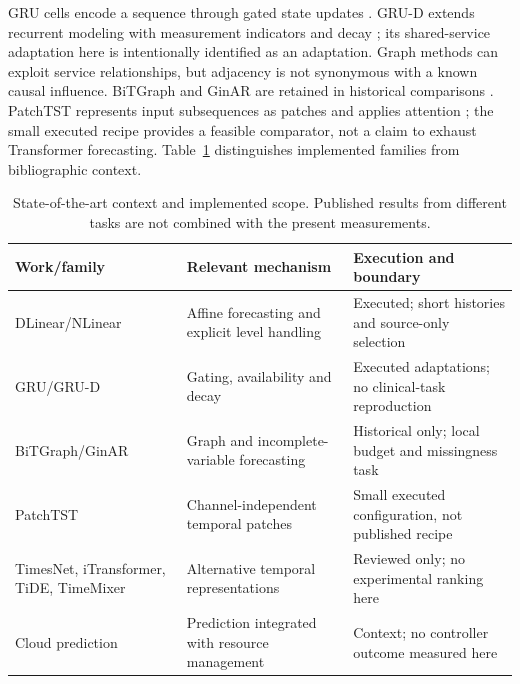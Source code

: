 GRU cells encode a sequence through gated state updates \cite{gru}. GRU-D extends recurrent modeling with measurement indicators and decay \cite{grud}; its shared-service adaptation here is intentionally identified as an adaptation. Graph methods can exploit service relationships, but adjacency is not synonymous with a known causal influence. BiTGraph and GinAR are retained in historical comparisons \cite{bitgraph,ginar}. PatchTST represents input subsequences as patches and applies attention \cite{patchtst}; the small executed recipe provides a feasible comparator, not a claim to exhaust Transformer forecasting. Table~\ref{tab:related} distinguishes implemented families from bibliographic context.

\begin{table}[!t]
\caption{State-of-the-art context and implemented scope. Published results from different tasks are not combined with the present measurements.}\label{tab:related}
\centering\footnotesize
\begin{tabularx}{\linewidth}{p{.23\linewidth}XX}
\toprule Work/family & Relevant mechanism & Execution and boundary \\\midrule
DLinear/NLinear \cite{dlinear} & Affine forecasting and explicit level handling & Executed; short histories and source-only selection \\
GRU/GRU-D \cite{gru,grud} & Gating, availability and decay & Executed adaptations; no clinical-task reproduction \\
BiTGraph/GinAR \cite{bitgraph,ginar} & Graph and incomplete-variable forecasting & Historical only; local budget and missingness task \\
PatchTST \cite{patchtst} & Channel-independent temporal patches & Small executed configuration, not published recipe \\
TimesNet, iTransformer, TiDE, TimeMixer \cite{timesnet,itransformer,tide,timemixer} & Alternative temporal representations & Reviewed only; no experimental ranking here \\
Cloud prediction \cite{powerprediction,temposcale,aero,stamp} & Prediction integrated with resource management & Context; no controller outcome measured here \\
\bottomrule
\end{tabularx}
\end{table}

